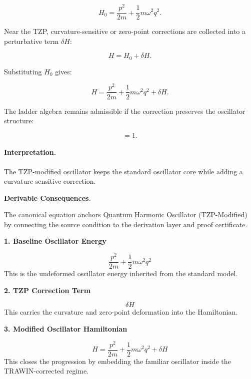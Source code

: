 \begin{equation}
H_0
=
\frac{p^2}{2m}
+
\frac{1}{2}m\omega^2 q^2 .
\end{equation}

Near the TZP, curvature-sensitive or zero-point corrections are collected into a perturbative term $\delta H$:

\begin{equation}
H = H_0+\delta H .
\end{equation}

Substituting $H_0$ gives:

\begin{equation}
\boxed{
H
=
\frac{p^2}{2m}
+
\frac{1}{2}m\omega^2 q^2
+
\delta H .
}
\end{equation}

The ladder algebra remains admissible if the correction preserves the oscillator structure:

\begin{equation}
[a,a^\dagger]=1 .
\end{equation}

\paragraph{Interpretation.}
The TZP-modified oscillator keeps the standard oscillator core while adding a curvature-sensitive correction.

\par\vspace{0.35em}
\noindent\textbf{Derivable Consequences.}\quad
\begingroup
\footnotesize
\raggedright
The canonical equation anchors Quantum Harmonic Oscillator (TZP-Modified) by connecting the source condition to the derivation layer and proof certificate.
\par\endgroup

\noindent\textbf{1. Baseline Oscillator Energy}\par
\[
\frac{p^{2}}{2m} + \frac{1}{2}m\omega^{2}q^{2}
\]
\noindent This is the undeformed oscillator energy inherited from the standard model.\par
\noindent\textbf{2. TZP Correction Term}\par
\[
\delta H
\]
\noindent This carries the curvature and zero-point deformation into the Hamiltonian.\par
\noindent\textbf{3. Modified Oscillator Hamiltonian}\par
\[
H
=
\frac{p^{2}}{2m}
+
\frac{1}{2}m\omega^{2}q^{2}
+
\delta H
\]
\noindent This closes the progression by embedding the familiar oscillator inside the TRAWIN-corrected regime.\par

